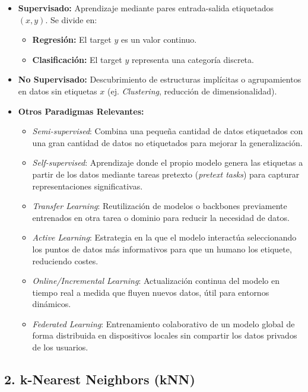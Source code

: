 \begin{itemize}
	\item \textbf{Supervisado:} Aprendizaje mediante pares entrada-salida etiquetados $(x, y)$. Se divide en:
	\begin{itemize}
		\item \textbf{Regresión:} El target $y$ es un valor continuo.
		\item \textbf{Clasificación:} El target $y$ representa una categoría discreta.
	\end{itemize}
	
	\item \textbf{No Supervisado:} Descubrimiento de estructuras implícitas o agrupamientos en datos sin etiquetas $x$ (ej. \emph{Clustering}, reducción de dimensionalidad).
	
	\item \textbf{Otros Paradigmas Relevantes:}
	\begin{itemize}
		\item \emph{Semi-supervised}: Combina una pequeña cantidad de datos etiquetados con una gran cantidad de datos no etiquetados para mejorar la generalización.
		\item \emph{Self-supervised}: Aprendizaje donde el propio modelo genera las etiquetas a partir de los datos mediante tareas pretexto (\emph{pretext tasks}) para capturar representaciones significativas.
		\item \emph{Transfer Learning}: Reutilización de modelos o backbones previamente entrenados en otra tarea o dominio para reducir la necesidad de datos.
		\item \emph{Active Learning}: Estrategia en la que el modelo interactúa seleccionando los puntos de datos más informativos para que un humano los etiquete, reduciendo costes.
		\item \emph{Online/Incremental Learning}: Actualización continua del modelo en tiempo real a medida que fluyen nuevos datos, útil para entornos dinámicos.
		\item \emph{Federated Learning}: Entrenamiento colaborativo de un modelo global de forma distribuida en dispositivos locales sin compartir los datos privados de los usuarios.
	\end{itemize}
\end{itemize}

\subsection{2. k-Nearest Neighbors (kNN)}

